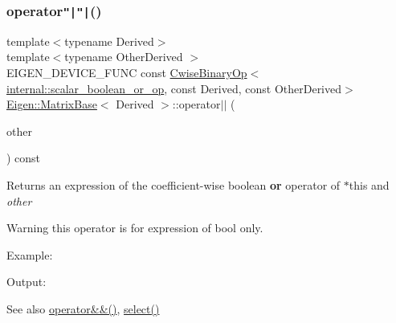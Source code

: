 \subsubsection{\texorpdfstring{operator\texttt{"|}\texttt{"|}()}{operator||()}}
{\footnotesize\ttfamily template$<$typename Derived$>$ \\
template$<$typename Other\+Derived $>$ \\
E\+I\+G\+E\+N\+\_\+\+D\+E\+V\+I\+C\+E\+\_\+\+F\+U\+NC const \mbox{\hyperlink{class_eigen_1_1_cwise_binary_op}{Cwise\+Binary\+Op}}$<$\mbox{\hyperlink{struct_eigen_1_1internal_1_1scalar__boolean__or__op}{internal\+::scalar\+\_\+boolean\+\_\+or\+\_\+op}}, const Derived, const Other\+Derived$>$ \mbox{\hyperlink{class_eigen_1_1_matrix_base}{Eigen\+::\+Matrix\+Base}}$<$ Derived $>$\+::operator$\vert$$\vert$ (\begin{DoxyParamCaption}\item[{const E\+I\+G\+E\+N\+\_\+\+C\+U\+R\+R\+E\+N\+T\+\_\+\+S\+T\+O\+R\+A\+G\+E\+\_\+\+B\+A\+S\+E\+\_\+\+C\+L\+A\+SS$<$ Other\+Derived $>$ \&}]{other }\end{DoxyParamCaption}) const\hspace{0.3cm}{\ttfamily [inline]}}

\begin{DoxyReturn}{Returns}
an expression of the coefficient-\/wise boolean {\bfseries{or}} operator of {\ttfamily $\ast$this} and {\itshape other} 
\end{DoxyReturn}
\begin{DoxyWarning}{Warning}
this operator is for expression of bool only.
\end{DoxyWarning}
Example\+: 
\begin{DoxyCodeInclude}{0}
\end{DoxyCodeInclude}
 Output\+: 
\begin{DoxyVerbInclude}
\end{DoxyVerbInclude}


\begin{DoxySeeAlso}{See also}
\mbox{\hyperlink{class_eigen_1_1_matrix_base_ac627838c5639468b08f77733c88acdcb}{operator\&\&()}}, \mbox{\hyperlink{class_eigen_1_1_dense_base_a65e78cfcbc9852e6923bebff4323ddca}{select()}} 
\end{DoxySeeAlso}
\mbox{\label{class_eigen_1_1_matrix_base_a6199d8aaf26c1b8ac3097fdfa7733a1e}} 
